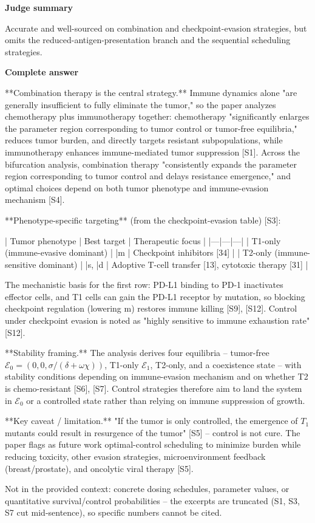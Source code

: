 \documentclass[10pt]{article}
\begin{document}
\textbf{Judge summary}
\begin{EvidenceText}
Accurate and well-sourced on combination and checkpoint-evasion strategies, but omits the reduced-antigen-presentation branch and the sequential scheduling strategies.
\end{EvidenceText}

\textbf{Complete answer}
\begin{AnswerText}
**Combination therapy is the central strategy.** Immune dynamics alone "are generally insufficient to fully eliminate the tumor," so the paper analyzes chemotherapy plus immunotherapy together: chemotherapy "significantly enlarges the parameter region corresponding to tumor control or tumor-free equilibria," reduces tumor burden, and directly targets resistant subpopulations, while immunotherapy enhances immune-mediated tumor suppression [S1]. Across the bifurcation analysis, combination therapy "consistently expands the parameter region corresponding to tumor control and delays resistance emergence," and optimal choices depend on both tumor phenotype and immune-evasion mechanism [S4].

**Phenotype-specific targeting** (from the checkpoint-evasion table) [S3]:

| Tumor phenotype | Best target | Therapeutic focus |
|---|---|---|
| T1-only (immune-evasive dominant) | |m | Checkpoint inhibitors [34] |
| T2-only (immune-sensitive dominant) | |s, |d | Adoptive T-cell transfer [13], cytotoxic therapy [31] |

The mechanistic basis for the first row: PD-L1 binding to PD-1 inactivates effector cells, and T1 cells can gain the PD-L1 receptor by mutation, so blocking checkpoint regulation (lowering m) restores immune killing [S9], [S12]. Control under checkpoint evasion is noted as "highly sensitive to immune exhaustion rate" [S12].

**Stability framing.** The analysis derives four equilibria -- tumor-free $\mathcal{E}_0=(0,0,\sigma/(\delta+\omega\chi))$, T1-only $\mathcal{E}_1$, T2-only, and a coexistence state -- with stability conditions depending on immune-evasion mechanism and on whether T2 is chemo-resistant [S6], [S7]. Control strategies therefore aim to land the system in $\mathcal{E}_0$ or a controlled state rather than relying on immune suppression of growth.

**Key caveat / limitation.** "If the tumor is only controlled, the emergence of $T_1$ mutants could result in resurgence of the tumor" [S5] -- control is not cure. The paper flags as future work optimal-control scheduling to minimize burden while reducing toxicity, other evasion strategies, microenvironment feedback (breast/prostate), and oncolytic viral therapy [S5].

Not in the provided context: concrete dosing schedules, parameter values, or quantitative survival/control probabilities -- the excerpts are truncated (S1, S3, S7 cut mid-sentence), so specific numbers cannot be cited.
\end{AnswerText}
\end{document}
